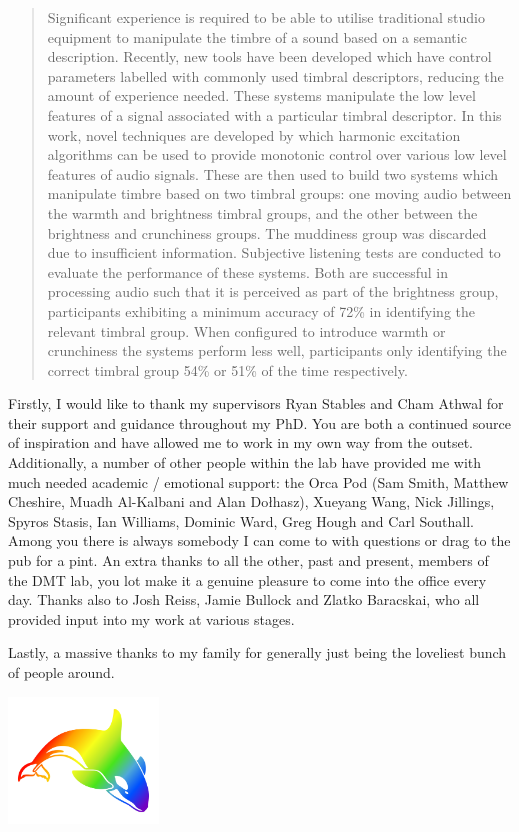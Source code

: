 \begin{abstract}
	Significant experience is required to be able to utilise traditional studio equipment to manipulate the timbre of a
	sound based on a semantic description. Recently, new tools have been developed which have control parameters
	labelled with commonly used timbral descriptors, reducing the amount of experience needed. These systems manipulate
	the low level features of a signal associated with a particular timbral descriptor. In this work, novel techniques
	are developed by which harmonic excitation algorithms can be used to provide monotonic control over various low
	level features of audio signals. These are then used to build two systems which manipulate timbre based on two
	timbral groups: one moving audio between the warmth and brightness timbral groups, and the other between the
	brightness and crunchiness groups. The muddiness group was discarded due to insufficient information. Subjective
	listening tests are conducted to evaluate the performance of these systems. Both are successful in processing audio
	such that it is perceived as part of the brightness group, participants exhibiting a minimum accuracy of 72\% in
	identifying the relevant timbral group. When configured to introduce warmth or crunchiness the systems perform less
	well, participants only identifying the correct timbral group 54\% or 51\% of the time respectively.
\end{abstract}

\begin{acknowledgements}
	Firstly, I would like to thank my supervisors Ryan Stables and Cham Athwal for their support and guidance throughout
	my PhD. You are both a continued source of inspiration and have allowed me to work in my own way from the outset.
	Additionally, a number of other people within the lab have provided me with much needed academic / emotional
	support: the Orca Pod (Sam Smith, Matthew Cheshire, Muadh Al-Kalbani and Alan Do\l{}hasz), Xueyang Wang, Nick
	Jillings, Spyros Stasis, Ian Williams, Dominic Ward, Greg Hough and Carl Southall. Among you there is always
	somebody I can come to with questions or drag to the pub for a pint. An extra thanks to all the other, past and
	present, members of the DMT lab, you lot make it a genuine pleasure to come into the office every day. Thanks also
	to Josh Reiss, Jamie Bullock and Zlatko Baracskai, who all provided input into my work at various stages.

	Lastly, a massive thanks to my family for generally just being the loveliest bunch of people around.

	\begin{center}
		\includegraphics[width=0.3\textwidth]{Images/orca.pdf}
	\end{center}
\end{acknowledgements}

\tableofcontents
\listoffigures
\listoftables
{}
\printglossaries
\cleardoublepage
